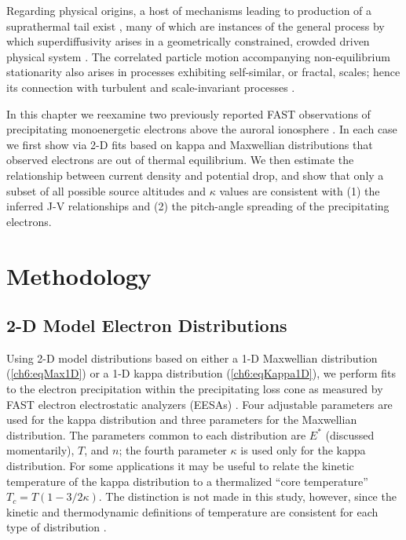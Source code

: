   Regarding physical origins, a host of mechanisms leading to production of a
  suprathermal tail exist \citep[e.g., review by][]{Pierrard2010}, many of which
  are instances of the general process by which superdiffusivity arises in a
  geometrically constrained, crowded driven physical system
  \citep{Benichou2013}.  The correlated particle motion accompanying
  non-equilibrium stationarity also arises in processes exhibiting self-similar,
  or fractal, scales; hence its connection with turbulent and scale-invariant
  processes \citep{West1990,Treumann1999a,Leubner2004}.

  In this chapter we reexamine two previously reported FAST observations of
  precipitating monoenergetic electrons above the auroral ionosphere
  \citep{Elphic1998,Ergun1998a}. In each case we first show via 2-D fits based
  on kappa and Maxwellian distributions that observed electrons are out of
  thermal equilibrium. We then estimate the relationship between current density
  and potential drop, and show that only a subset of all possible source
  altitudes and $\kappa$ values are consistent with (1) the inferred J-V
  relationships and (2) the pitch-angle spreading of the precipitating
  electrons.

  \section{Methodology}

  \subsection{2-D Model Electron Distributions} \label{ss2D}

  Using 2-D model distributions based on either a 1-D Maxwellian distribution
  (\ref{ch6:eqMax1D}) or a 1-D kappa distribution (\ref{ch6:eqKappa1D}), we
  perform fits to the electron precipitation within the precipitating loss cone
  as measured by FAST electron electrostatic analyzers (EESAs) \citep{Carlson2001}. Four
  adjustable parameters are used for the kappa distribution and three parameters
  for the Maxwellian distribution. The parameters common to each distribution
  are $E^*$ (discussed momentarily), $T$, and $n$; the fourth parameter $\kappa$
  is used only for the kappa distribution. For some applications
  \citep[e.g.,][]{Sutherland2012} it may be useful to relate the kinetic
  temperature of the kappa distribution to a thermalized ``core temperature''
  $T_c = T (1-3/2 \kappa)$. The distinction is not made in this study, however,
  since the kinetic and thermodynamic definitions of temperature are consistent
  for each type of distribution \citep{Livadiotis2010}.

